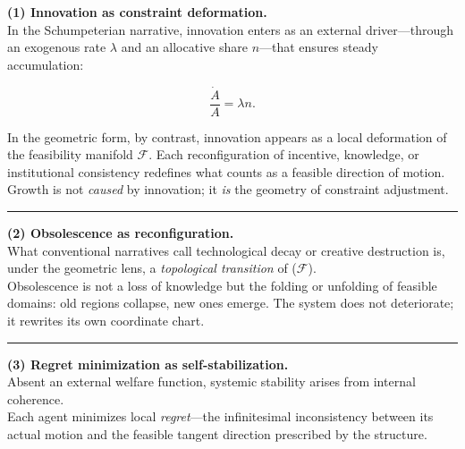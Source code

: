 \documentclass[11pt]{article}
\begin{document}
\textbf{(1) Innovation as constraint deformation.}\\
In the Schumpeterian narrative, innovation enters as an external
driver---through an exogenous rate \(\lambda\) and an allocative share
\(n\)---that ensures steady accumulation:

\[
\frac{\dot{A}}{A} = \lambda n.
\]

In the geometric form, by contrast, innovation appears as a local
deformation of the feasibility manifold \(\mathcal{F}\). Each
reconfiguration of incentive, knowledge, or institutional consistency
redefines what counts as a feasible direction of motion.\\
Growth is not \emph{caused} by innovation; it \emph{is} the geometry of
constraint adjustment.

\begin{center}\rule{0.5\linewidth}{0.5pt}\end{center}

\textbf{(2) Obsolescence as reconfiguration.}\\
What conventional narratives call technological decay or creative
destruction is, under the geometric lens, a \emph{topological
transition} of (\(\mathcal{F}\)).\\
Obsolescence is not a loss of knowledge but the folding or unfolding of
feasible domains: old regions collapse, new ones emerge. The system does
not deteriorate; it rewrites its own coordinate chart.

\begin{center}\rule{0.5\linewidth}{0.5pt}\end{center}

\textbf{(3) Regret minimization as self-stabilization.}\\
Absent an external welfare function, systemic stability arises from
internal coherence.\\
Each agent minimizes local \emph{regret}---the infinitesimal
inconsistency between its actual motion and the feasible tangent
direction prescribed by the structure.

\begin{Shaded}
\begin{Highlighting}[]
\end{Highlighting}
\end{Shaded}
\end{document}

